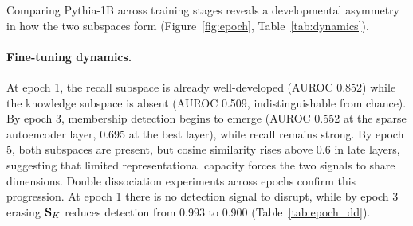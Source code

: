 \begin{table}[!htbp]
\centering
\caption{Developmental path of channel decomposition at the sparse autoencoder layer.
Top row shows fine-tuning epochs for Pythia-1B.
Bottom row shows pretraining checkpoints for Pythia-1B (no fine-tuning).
Recall emerges before knowledge in both regimes.}
\label{tab:dynamics}
\end{table}

Comparing Pythia-1B across training stages reveals a developmental asymmetry in how the two subspaces form (Figure~\ref{fig:epoch}, Table~\ref{tab:dynamics}).

\paragraph{Fine-tuning dynamics.}
At epoch 1, the recall subspace is already well-developed (AUROC 0.852) while the knowledge subspace is absent (AUROC 0.509, indistinguishable from chance).
By epoch 3, membership detection begins to emerge (AUROC 0.552 at the sparse autoencoder layer, 0.695 at the best layer), while recall remains strong.
By epoch 5, both subspaces are present, but cosine similarity rises above 0.6 in late layers, suggesting that limited representational capacity forces the two signals to share dimensions.
Double dissociation experiments across epochs confirm this progression. At epoch 1 there is no detection signal to disrupt, while by epoch 3 erasing $\mathbf{S}_K$ reduces detection from 0.993 to 0.900 (Table~\ref{tab:epoch_dd}).

